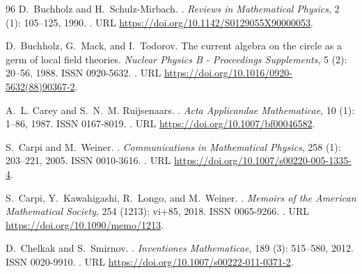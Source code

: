 \documentclass[a4paper, 11pt]{article}
\DeclareMathOperator{\1}{\mathds{1}}
\begin{document}
\begin{thebibliography}{96}
D.~Buchholz and H.~Schulz-Mirbach.
.
\newblock \emph{Reviews in Mathematical Physics}, 2 (1):
  105--125, 1990.
\newblock {}.
\newblock URL \url{https://doi.org/10.1142/S0129055X90000053}.

D.~Buchholz, G.~Mack, and I.~Todorov.
\newblock The current algebra on the circle as a germ of local field theories.
\newblock \emph{Nuclear Physics B - Proceedings Supplements}, 5
  (2): 20--56, 1988.
\newblock ISSN 0920-5632.
\newblock {}.
\newblock URL \url{https://doi.org/10.1016/0920-5632(88)90367-2}.

A.~L. Carey and S.~N.~M. Ruijsenaars.
.
\newblock \emph{Acta Applicandae Mathematicae}, 10 (1):
  1--86, 1987.
\newblock ISSN 0167-8019.
\newblock {}.
\newblock URL \url{https://doi.org/10.1007/bf00046582}.

S.~Carpi and M.~Weiner.
.
\newblock \emph{Communications in Mathematical Physics}, 258
  (1): 203--221, 2005.
\newblock ISSN 0010-3616.
\newblock {}.
\newblock URL \url{https://doi.org/10.1007/s00220-005-1335-4}.

S.~Carpi, Y.~Kawahigashi, R.~Longo, and M.~Weiner.
.
\newblock \emph{Memoirs of the American Mathematical Society}, 254
  (1213): vi+85, 2018.
\newblock ISSN 0065-9266.
\newblock {}.
\newblock URL \url{https://doi.org/10.1090/memo/1213}.

D.~Chelkak and S.~Smirnov.
.
\newblock \emph{Inventiones Mathematicae}, 189 (3): 515--580,
  2012.
\newblock ISSN 0020-9910.
\newblock {}.
\newblock URL \url{https://doi.org/10.1007/s00222-011-0371-2}.


\end{thebibliography}
\end{document}
